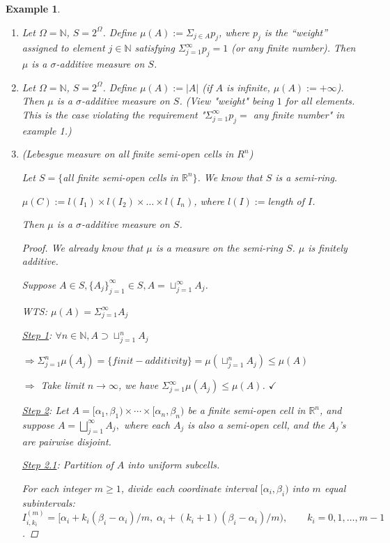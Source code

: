 \documentclass[12pt]{article}
\theoremstyle{blueplain}
\theoremstyle{bluedef}
\theoremstyle{blueremark}
\newtheorem{example}{Example}[section]
\newcommand{\R}{\mathbb{R}}
\newcommand{\N}{\mathbb{N}}
\numberwithin{equation}{section}
\begin{document}
\begin{example}
  \begin{enumerate}
    \item Let $\Omega = \N$, $S = 2^\Omega$. Define $\mu(A) := \Sigma_{j \in A} p_j$, where $p_j$ is the ``weight'' assigned to element $j \in \N$ satisfying $\Sigma_{j=1}^\infty p_j = 1$ (or any finite number). Then $\mu$ is a $\sigma$-additive measure on $S$.
    \item Let $\Omega = \N$, $S = 2^\Omega$. Define $\mu(A) := |A|$ (if $A$ is infinite, $\mu(A) := +\infty$). Then $\mu$ is a $\sigma$-additive measure on $S$. (View "weight" being $1$ for all elements. This is the case violating the requirement "$\Sigma_{j=1}^\infty p_j =$ any finite number" in example 1.)
    \item (Lebesgue measure on all finite semi-open cells in $R^n$)

          Let $S = \{$all finite semi-open cells in $\R^n \}$. We know that $S$ is a semi-ring.

          $\mu(C) := l(I_1) \times l(I_2) \times \ldots \times l(I_n)$, where $l(I) := $length of $I$.

          Then $\mu$ is a $\sigma$-additive measure on $S$.
          \begin{proof}
            We already know that $\mu$ is a measure on the semi-ring $S$. $\mu$ is finitely additive.

            Suppose $A \in S, \{A_j\}_{j=1}^{\infty} \in S, A = \sqcup_{j=1}^{\infty} A_j$.

            WTS: $\mu(A) = \Sigma_{j=1}^{\infty} A_j$

            \underline{Step 1}: $\forall n \in \N, A \supset \sqcup_{j=1}^n A_j$

            $\Rightarrow \Sigma_{j=1}^n \mu(A_j) = \{finit-additivity\} =\mu(\sqcup_{j=1}^n A_j) \leq \mu(A)$

            $\Rightarrow$ Take limit $n \rightarrow \infty$, we have $\Sigma_{j=1}^{\infty} \mu(A_j) \leq \mu(A)$. $\checkmark$

            \underline{Step 2}: Let $A = [\alpha_1,\beta_1) \times \cdots \times [\alpha_n,\beta_n)$ be a finite semi-open cell in $\mathbb{R}^n$, and suppose $A = \bigsqcup_{j=1}^{\infty} A_j,$ where each $A_j$ is also a semi-open cell, and the $A_j$'s are pairwise disjoint.

            \underline{Step 2.1}: Partition of $A$ into uniform subcells.

            For each integer $m \ge 1$, divide each coordinate interval $[\alpha_i,\beta_i)$ into $m$ equal subintervals: $I^{(m)}_{i,k_i} = \big[\alpha_i + k_i(\beta_i-\alpha_i)/m,\; \alpha_i + (k_i+1)(\beta_i-\alpha_i)/m\big), \qquad k_i = 0,1,\dots,m-1$.


\end{proof}
\end{enumerate}
\end{example}
\end{document}
